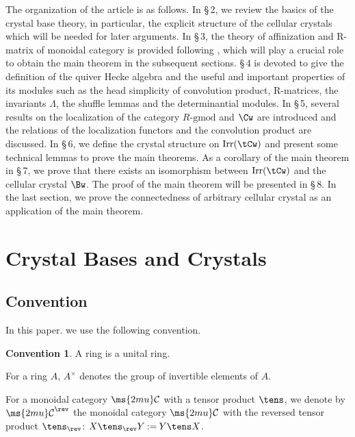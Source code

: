 \documentclass[12pt,leqno]{amsart}%
\theoremstyle{plain}
\theoremstyle{definition}
\newtheorem*{convention}{Convention}
\newcommand{\seteq}{\mathbin{:=}}
\newcommand{\gmod}{\text{-}\mathrm{gmod}}
\newcommand{\La}{\Lambda} 			%
\newcommand{\bnum}{\be[{\rm(i)}]}
\newcommand{\shc}{{\ms{2mu}\mathcal{C}}}
\newcommand{\Irr}{\mathrm{Irr}}
\numberwithin{equation}{section}
\begin{document}
\medskip
The organization of the article is as follows. 
In \S\,2, we review the basics of the crystal base theory, in particular, the explicit structure of 
the cellular crystals which will be needed for later arguments.
In \S\,3, the theory of affinization and R-matrix of monoidal category is provided following \cite{ref}, which will play a crucial role to obtain the main theorem in the subsequent sections. \S\,4 is devoted to give the definition of the quiver Hecke algebra and the useful and important properties of its modules such as 
the head simplicity of convolution product, R-matrices, the invariants $\La$, the shuffle lemmas and 
the determinantial modules.
In \S\,5, several results on the localization of the category $R\gmod$ and $\Cw$ are introduced and 
the relations of the localization functors and the convolution product are discussed.
In \S\,6, we define the crystal structure on $\Irr(\tCw)$ and 
present some technical lemmas to prove the main theorems. As a corollary  of the main theorem in \S\,7, we prove that there exists an isomorphism between $\Irr(\tCw)$ and the cellular crystal $\Bw$.
  The proof of the main theorem  
  will be presented in \S\,8. In the last section,
  we prove the connectedness of arbitrary cellular crystal
 as an application of the main theorem. 



 \section{Crystal Bases and Crystals}
\subsection{Convention}
In this paper. we use the following convention.
\begin{convention}
\bnum
\item A ring is a unital ring.
\item For a ring $A$, $A^\times$ denotes the group of invertible elements of $A$.
\item For a monoidal category $\shc$ with a tensor product $\tens$,
  we denote by $\shc^\rev$ the monoidal category $\shc$ with the reversed
  tensor product $\tens_\rev$: $X\tens_\rev Y\seteq Y\tens X$.
  \ee
\end{convention}
\end{document}
